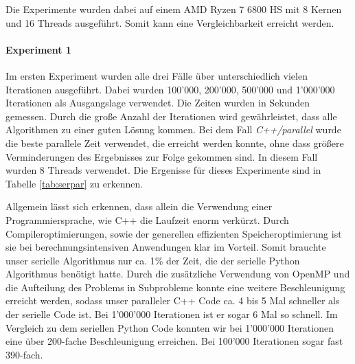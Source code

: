 \documentclass[sigconf]{acmart}
\begin{document}
Die Experimente wurden dabei auf einem AMD Ryzen 7 6800 HS mit 8 Kernen und 16 Threads ausgeführt. Somit kann eine Vergleichbarkeit erreicht werden.

\paragraph{Experiment 1}

Im ersten Experiment wurden alle drei Fälle über unterschiedlich vielen Iterationen ausgeführt. Dabei wurden 100'000, 200'000, 500'000 und 1'000'000 Iterationen als Ausgangslage verwendet. Die Zeiten wurden in Sekunden gemessen. Durch die große Anzahl der Iterationen wird gewährleistet, dass alle Algorithmen zu einer guten Lösung kommen. 
Bei dem Fall \textit{C++/parallel} wurde die beste parallele Zeit verwendet, die erreicht werden konnte, ohne dass größere Verminderungen des Ergebnisses zur Folge gekommen sind. In diesem Fall wurden 8 Threads verwendet.
 Die Ergenisse für dieses Experimente sind in Tabelle \ref{tab:serpar} zu erkennen.
 
\begin{table}[htbp]
  \caption{Vergleich der Algorithmen und Ausführungsart über 100'000, 200'000, 500'000 und 1'000'000 Iterationen. Alle Angaben in Sekunden.}
  \label{tab:serpar}
\end{table}

Allgemein lässt sich erkennen, dass allein die Verwendung einer Programmiersprache, wie C++ die Laufzeit enorm verkürzt. Durch Compileroptimierungen, sowie der generellen effizienten Speicheroptimierung ist sie bei berechnungsintensiven Anwendungen klar im Vorteil. Somit brauchte unser serielle Algorithmus nur ca. 1\% der Zeit, die der serielle Python Algorithmus benötigt hatte. 
Durch die zusätzliche Verwendung von OpenMP und die Aufteilung des Problems in Subprobleme konnte eine weitere Beschleunigung erreicht werden, sodass unser paralleler C++ Code ca. 4 bis 5 Mal schneller als der serielle Code ist. Bei 1'000'000 Iterationen ist er sogar 6 Mal so schnell. Im Vergleich zu dem seriellen Python Code konnten wir bei 1'000'000 Iterationen eine über 200-fache Beschleunigung erreichen. Bei 100'000 Iterationen sogar fast 390-fach.
\end{document}
